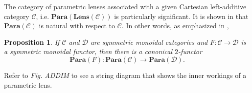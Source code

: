 \documentclass[11pt,a4paper,openright,twoside]{report}
\theoremstyle{plain}
\newtheorem{proposition}{Proposition}
\theoremstyle{definition}
\begin{document}
The category of parametric lenses associated with a given Cartesian left-additive category $\mathcal{C}$, i.e. $\mathbf{Para}(\mathbf{Lens}(\mathcal{C}))$ is particularly significant. It is shown in \cite{cruttwellDeepLearningParametric} that $\mathbf{Para}(\mathcal{C})$ is natural with respect to $\mathcal{C}$. In other words, as emphasized in \cite{shieblerCategoryTheoryMachine2021},

\begin{proposition}\label{proposition: canembedding2}
  If $\mathcal{C}$ and $\mathcal{D}$ are symmetric monoidal categories and $F: \mathcal{C} \to \mathcal{D}$ is a symmetric monoidal functor, then  there is a canonical $2$-functor 
  \[\mathbf{Para}(F): \mathbf{Para}(\mathcal{C}) \to \mathbf{Para}(\mathcal{D}).\]
\end{proposition}

Refer to \textit{Fig. ADDIM} to see a string diagram that shows the inner workings of a parametric lens.










\end{document}
